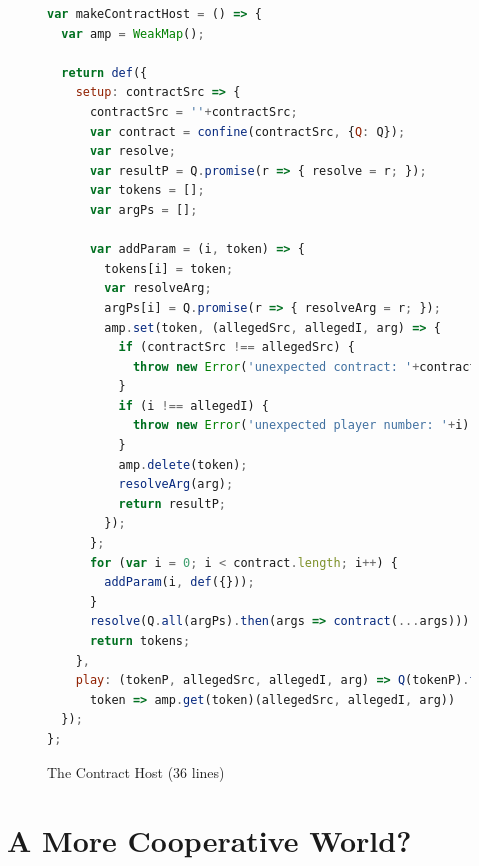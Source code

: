\documentclass{llncs}
\begin{document}
\begin{figure}[htbp]
\begin{center}
\begin{lstlisting}[language=javascript]
var makeContractHost = () => {
  var amp = WeakMap();

  return def({
    setup: contractSrc => {
      contractSrc = ''+contractSrc;
      var contract = confine(contractSrc, {Q: Q});
      var resolve;
      var resultP = Q.promise(r => { resolve = r; });
      var tokens = [];
      var argPs = [];

      var addParam = (i, token) => {
        tokens[i] = token;
        var resolveArg;
        argPs[i] = Q.promise(r => { resolveArg = r; });
        amp.set(token, (allegedSrc, allegedI, arg) => {
          if (contractSrc !== allegedSrc) {
            throw new Error('unexpected contract: '+contractSrc);
          }
          if (i !== allegedI) {
            throw new Error('unexpected player number: '+i);
          }
          amp.delete(token);
          resolveArg(arg);
          return resultP;
        });
      };
      for (var i = 0; i < contract.length; i++) {
        addParam(i, def({}));
      }
      resolve(Q.all(argPs).then(args => contract(...args)));
      return tokens;
    },
    play: (tokenP, allegedSrc, allegedI, arg) => Q(tokenP).then(
      token => amp.get(token)(allegedSrc, allegedI, arg))
  });
};
\end{lstlisting}
\caption{The Contract Host (36 lines)}
\label{makeContractHost}
\end{center}
\end{figure}

\section{A More Cooperative World?}


% 

\end{document}
